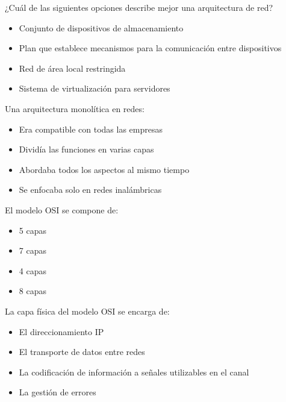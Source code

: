 \documentclass[11pt]{article}
\author{Ismael Macareno Chouikh}
\date{\today}
\title{}
\begin{document}
\tableofcontents

¿Cuál de las siguientes opciones describe mejor una arquitectura de red?

\begin{itemize}
\item Conjunto de dispositivos de almacenamiento

\item Plan que establece mecanismos para la comunicación entre dispositivos

\item Red de área local restringida

\item Sistema de virtualización para servidores
\end{itemize}

Una arquitectura monolítica en redes:

\begin{itemize}
\item Era compatible con todas las empresas

\item Dividía las funciones en varias capas

\item Abordaba todos los aspectos al mismo tiempo

\item Se enfocaba solo en redes inalámbricas
\end{itemize}

El modelo OSI se compone de:

\begin{itemize}
\item 5 capas

\item 7 capas

\item 4 capas

\item 8 capas
\end{itemize}

La capa física del modelo OSI se encarga de:

\begin{itemize}
\item El direccionamiento IP

\item El transporte de datos entre redes

\item La codificación de información a señales utilizables en el canal

\item La gestión de errores
\end{itemize}
\end{document}
